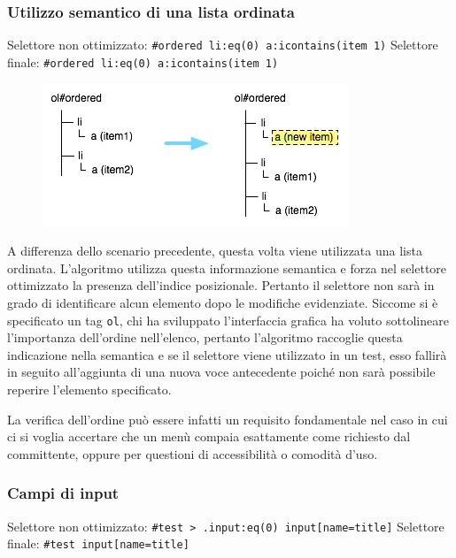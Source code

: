 \documentclass[12pt]{toptesi}
\begin{document}
\subsubsection {Utilizzo semantico di una lista ordinata}

Selettore non ottimizzato:  \verb|#ordered li:eq(0) a:icontains(item 1)| 
\newline
Selettore finale:  \verb|#ordered li:eq(0) a:icontains(item 1)| 

\begin{figure}[htbp]
\begin{center}
\includegraphics{images/dom_examples/ordered_menu.png}
\end{center}
\end{figure}

A differenza dello scenario precedente, questa volta viene utilizzata una lista ordinata. L'algoritmo utilizza questa informazione semantica e forza nel selettore ottimizzato la presenza dell'indice posizionale. Pertanto il selettore non sarà in grado di identificare alcun elemento dopo le modifiche evidenziate. Siccome si è specificato un tag \verb|ol|, chi ha sviluppato l'interfaccia grafica ha voluto sottolineare l'importanza dell'ordine nell'elenco, pertanto l'algoritmo raccoglie questa indicazione nella semantica e se il selettore viene utilizzato in un test, esso fallirà in seguito all'aggiunta di una nuova voce antecedente poiché non sarà possibile reperire l'elemento specificato.

La verifica dell'ordine può essere infatti un requisito fondamentale nel caso in cui ci si voglia accertare che un menù compaia esattamente come richiesto dal committente, oppure per questioni di accessibilità o comodità d'uso.

\subsubsection {Campi di input}

Selettore non ottimizzato:  \verb|#test > .input:eq(0) input[name=title]| 
\newline
Selettore finale:  \verb|#test input[name=title]| 
\end{document}
